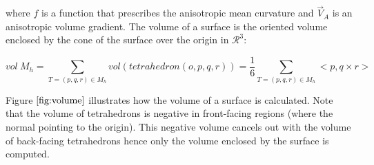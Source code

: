 \documentclass[11pt]{article}
\begin{document}
where $f$ is a function that prescribes the anisotropic mean curvature and $\vec{V}_A$ is an anisotropic volume gradient. The volume of a surface is the oriented volume enclosed by the cone of the surface over the origin in $\mathcal{R}^3$:

\begin{equation}
vol \ M_h = \sum\limits_{T=(p, q, r) \in M_h}vol(tetrahedron(o, p, q, r)) = \frac{1}{6}\sum\limits_{T=(p, q, r) \in M_h}<p, q \times r>
\label{eq:volume}
\end{equation}

Figure $\ref{fig:volume}$ illustrates how the volume of a surface is calculated. Note that the volume of tetrahedrons is negative in front-facing regions (where the normal pointing to the origin). This negative volume cancels out with the volume of back-facing tetrahedrons hence only the volume enclosed by the surface is computed.
\end{document}
